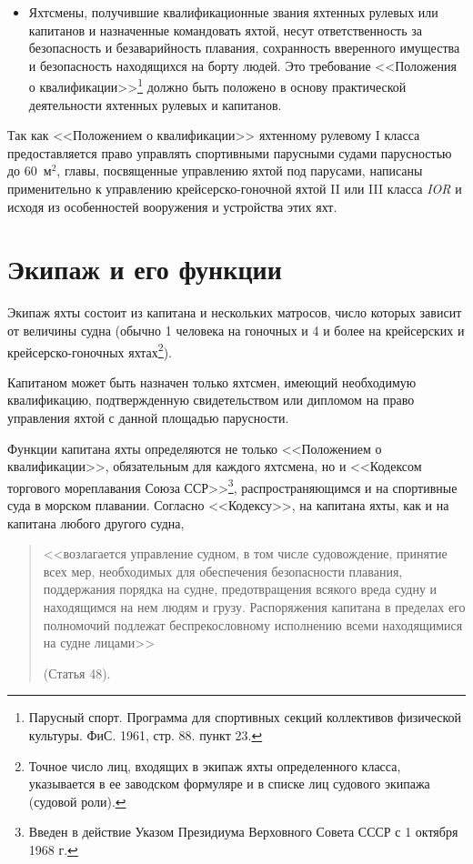 \documentclass[a4paper, 12pt, twoside, final]{scrbook}
\begin{document}
\begin{itemize}
\item Яхтсмены, получившие квалификационные звания яхтенных рулевых или капитанов и назначенные командовать яхтой, несут ответственность за безопасность и безаварийность плавания, сохранность вверенного имущества и безопасность находящихся на борту людей. Это требование <<Положения о квалификации>>\footnote{Парусный спорт. Программа для спортивных секций коллективов физической культуры. ФиС. 1961, стр. 88. пункт 23.} должно быть положено в основу практической деятельности яхтенных рулевых и капитанов.
\end{itemize}

Так как <<Положением о квалификации>> яхтенному рулевому I класса предоставляется право управлять спортивными парусными судами парусностью до 60~м$^2$, главы, посвященные управлению яхтой под парусами, написаны применительно к управлению крейсерско-гоночной яхтой II или III класса \textit{IOR} и исходя из особенностей вооружения и устройства этих яхт.

\section{Экипаж и его функции}

Экипаж яхты состоит из капитана и нескольких матросов, число которых зависит от величины судна (обычно 1 человека на гоночных и 4 и более на крейсерских и крейсерско-гоночных яхтах\footnote{Точное число лиц, входящих в экипаж яхты определенного класса, указывается в ее заводском формуляре и в списке лиц судового экипажа (судовой роли).}).

Капитаном может быть назначен только яхтсмен, имеющий необходимую квалификацию, подтвержденную свидетельством или дипломом на право управления яхтой с данной площадью парусности.

Функции капитана яхты определяются не только <<Положением о квалификации>>, обязательным для каждого яхтсмена, но и <<Кодексом торгового мореплавания Союза ССР>>\footnote{Введен в действие Указом Президиума Верховного Совета СССР с 1 октября 1968 г.}, распространяющимся и на спортивные суда в морском плавании. Согласно <<Кодексу>>, на капитана яхты, как и на капитана любого другого судна, 

\begin{quote}
<<возлагается управление судном, в том числе судовождение, принятие всех мер, необходимых для обеспечения безопасности плавания, поддержания порядка на судне, предотвращения всякого вреда судну и находящимся на нем людям и грузу. Распоряжения капитана в пределах его полномочий подлежат беспрекословному исполнению всеми находящимися на судне лицами>>

(Статья 48).
\end{quote}
\end{document}
